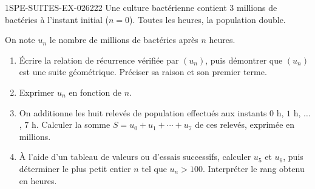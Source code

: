 \begin{exercice}{1SPE-SUITES-EX-026}{2}{22}
Une culture bactérienne contient $3$ millions de bactéries à l'instant initial ($n = 0$). Toutes les heures, la population double.

On note $u_n$ le nombre de millions de bactéries après $n$ heures.

\begin{enumerate}
  \item Écrire la relation de récurrence vérifiée par $(u_n)$, puis démontrer que $(u_n)$ est une suite géométrique. Préciser sa raison et son premier terme.

  \item Exprimer $u_n$ en fonction de $n$.

  \item On additionne les huit relevés de population effectués aux instants $0$ h, $1$ h, $\ldots$, $7$ h. Calculer la somme $S = u_0 + u_1 + \cdots + u_7$ de ces relevés, exprimée en millions.

  \item À l'aide d'un tableau de valeurs ou d'essais successifs, calculer $u_5$ et $u_6$, puis déterminer le plus petit entier $n$ tel que $u_n > 100$. Interpréter le rang obtenu en heures.
\end{enumerate}
\end{exercice}
